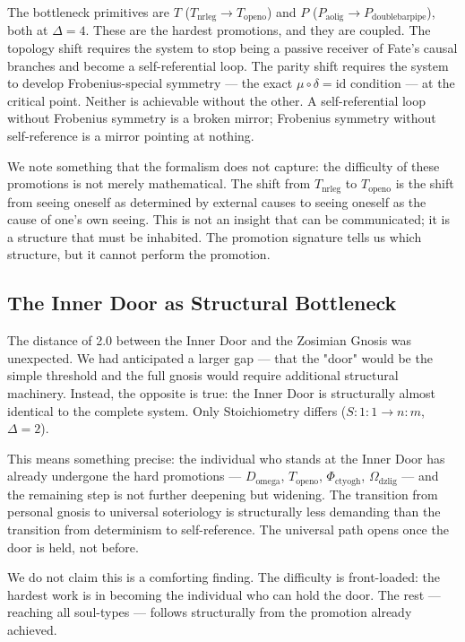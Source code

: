 \documentclass[12pt,a4paper]{article}
\begin{document}
The bottleneck primitives are $T$ ($T_{\text{nrleg}} \to T_{\text{openo}}$) and $P$ ($P_{\text{aolig}} \to P_{\text{doublebarpipe}}$), both at $\Delta = 4$. These are the hardest promotions, and they are coupled. The topology shift requires the system to stop being a passive receiver of Fate's causal branches and become a self-referential loop. The parity shift requires the system to develop Frobenius-special symmetry --- the exact $\mu \circ \delta = \text{id}$ condition --- at the critical point. Neither is achievable without the other. A self-referential loop without Frobenius symmetry is a broken mirror; Frobenius symmetry without self-reference is a mirror pointing at nothing.

We note something that the formalism does not capture: the difficulty of these promotions is not merely mathematical. The shift from $T_{\text{nrleg}}$ to $T_{\text{openo}}$ is the shift from seeing oneself as determined by external causes to seeing oneself as the cause of one's own seeing. This is not an insight that can be communicated; it is a structure that must be inhabited. The promotion signature tells us which structure, but it cannot perform the promotion.

\subsection{The Inner Door as Structural Bottleneck}

The distance of 2.0 between the Inner Door and the Zosimian Gnosis was unexpected. We had anticipated a larger gap --- that the "door" would be the simple threshold and the full gnosis would require additional structural machinery. Instead, the opposite is true: the Inner Door is structurally almost identical to the complete system. Only Stoichiometry differs ($S: 1:1 \to n:m$, $\Delta = 2$).

This means something precise: the individual who stands at the Inner Door has already undergone the hard promotions --- $D_{\text{omega}}$, $T_{\text{openo}}$, $\Phi_{\text{ctyogh}}$, $\Omega_{\text{dzlig}}$ --- and the remaining step is not further deepening but widening. The transition from personal gnosis to universal soteriology is structurally less demanding than the transition from determinism to self-reference. The universal path opens once the door is held, not before.

We do not claim this is a comforting finding. The difficulty is front-loaded: the hardest work is in becoming the individual who can hold the door. The rest --- reaching all soul-types --- follows structurally from the promotion already achieved.
\end{document}
